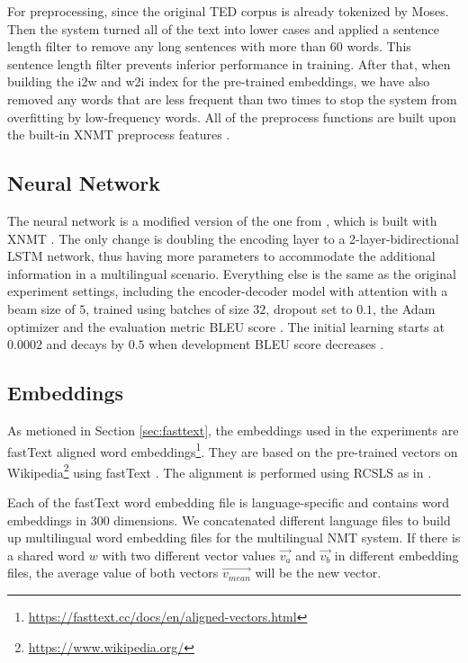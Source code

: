 \documentclass[thesis,fonts=libertine]{cluu}
\begin{document}
For preprocessing, since the original TED corpus is already tokenized by Moses. Then the system \textcite{Neubig:2018aa} turned all of the text into lower cases and applied a sentence length filter to remove any long sentences with more than 60 words. This sentence length filter prevents inferior performance in training. After that, when building the i2w and w2i index for the pre-trained embeddings, we have also removed any words that are less frequent than two times to stop the system from overfitting by low-frequency words. All of the preprocess functions are built upon the built-in XNMT preprocess features \parencite{Neubig:2018aa}.

\subsection{Neural Network}

The neural network is a modified version of the one from \textcite{Qi:2018aa}, which is built with XNMT \textcite{Neubig:2018aa}. The only change is doubling the encoding layer to a 2-layer-bidirectional LSTM network, thus having more parameters to accommodate the additional information in a multilingual scenario. Everything else is the same as the original experiment settings, including the encoder-decoder model with attention \parencite{Bahdanau:2014aa} with a beam size of $5$, trained using batches of size $32$, dropout set to $0.1$, the Adam optimizer \parencite{Kingma:2014aa} and the evaluation metric BLEU score \parencite{papineni-etal-2002-bleu}. The initial learning starts at $0.0002$ and decays by $0.5$ when development BLEU score decreases \parencite{Denkowski:2017aa}.

\subsection{Embeddings}

As metioned in Section \ref{sec:fasttext}, the embeddings used in the experiments are fastText aligned word embeddings\footnote{\url{https://fasttext.cc/docs/en/aligned-vectors.html}}. They are based on the pre-trained vectors on Wikipedia\footnote{\url{https://www.wikipedia.org/}} using fastText \parencite{Bojanowski:2016aa}. The alignment is performed using RCSLS as in \textcite{Joulin:2018aa}.

Each of the fastText word embedding file is language-specific and contains word embeddings in 300 dimensions. We concatenated different language files to build up multilingual word embedding files for the multilingual NMT system. If there is a shared word $w$ with two different vector values $\vec{v_a}$ and $\vec{v_b}$ in different embedding files, the average value of both vectors $\vec{v_{mean}}$ will be the new vector.
\end{document}
